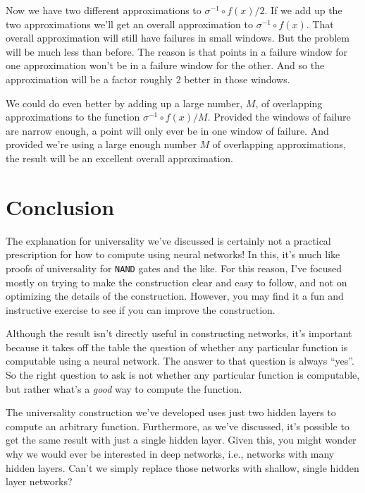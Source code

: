 Now we have two different approximations to $\sigma^{-1}\circ f(x)/2$. If we add up the two approximations we'll get an overall approximation to $\sigma^{-1}\circ f(x)$. That overall approximation will still have failures in small windows. But the problem will be much less than before. The reason is that points in a failure window for one approximation won't be in a failure window for the other. And so the approximation will be a factor roughly 2 better in those windows.

We could do even better by adding up a large number, $M$, of overlapping approximations to the function $\sigma^{-1}\circ f(x)/M$. Provided the windows of failure are narrow enough, a point will only ever be in one window of failure. And provided we're using a large enough number $M$ of overlapping approximations, the result will be an excellent overall approximation.

\section{Conclusion}

The explanation for universality we've discussed is certainly not a practical prescription for how to compute using neural networks! In this, it's much like proofs of universality for \lstinline{NAND} gates and the like. For this reason, I've focused mostly on trying to make the construction clear and easy to follow, and not on optimizing the details of the construction. However, you may find it a fun and instructive exercise to see if you can improve the construction.

Although the result isn't directly useful in constructing networks, it's important because it takes off the table the question of whether any particular function is computable using a neural network. The answer to that question is always ``yes''. So the right question to ask is not whether any particular function is computable, but rather what's a \textit{good} way to compute the function.

The universality construction we've developed uses just two hidden layers to compute an arbitrary function. Furthermore, as we've discussed, it's possible to get the same result with just a single hidden layer. Given this, you might wonder why we would ever be interested in deep networks, i.e., networks with many hidden layers. Can't we simply replace those networks with shallow, single hidden layer networks?


